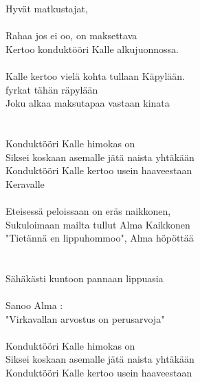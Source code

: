 
Hyvät matkustajat, \\
\\
Rahaa jos ei oo, on maksettava \\
Kertoo konduktööri Kalle alkujuonnossa.\\ 
\hspace{10mm} \\
Kalle kertoo vielä kohta tullaan Käpylään.\\
 fyrkat tähän räpylään\\
Joku alkaa maksutapaa vastaan kinata\\
\\
\hspace{10mm} \\
    Konduktööri Kalle himokas on \\
    Siksei koskaan asemalle jätä naista yhtäkään\\
    Konduktööri Kalle kertoo usein haaveestaan\\
     Keravalle \\
\hspace{10mm} \\
Eteisessä peloissaan on eräs naikkonen,\\
Sukuloimaan mailta tullut Alma Kaikkonen\\
"Tietännä en lippuhommoo", Alma höpöttää\\
\\
\hspace{10mm} \\
Sähäkästi kuntoon pannaan lippuasia\\
\\
Sanoo Alma :\\
"Virkavallan arvostus on perusarvoja"\\
\hspace{10mm}\\
    Konduktööri Kalle himokas on \\
    Siksei koskaan asemalle jätä naista yhtäkään\\
    Konduktööri Kalle kertoo usein haaveestaan\\
